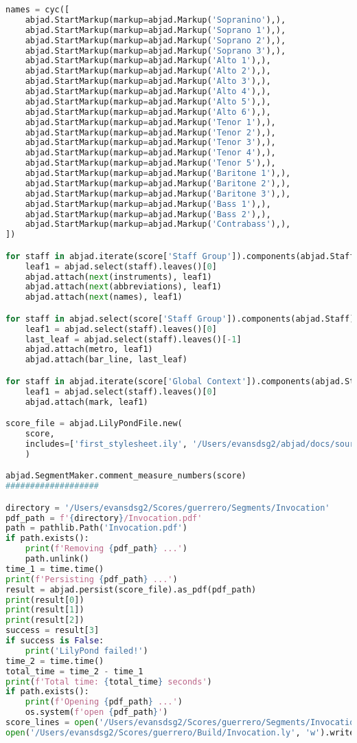 \begin{lstlisting}[language=Python, caption=Invocation Source Code]
names = cyc([
    abjad.StartMarkup(markup=abjad.Markup('Sopranino'),),
    abjad.StartMarkup(markup=abjad.Markup('Soprano 1'),),
    abjad.StartMarkup(markup=abjad.Markup('Soprano 2'),),
    abjad.StartMarkup(markup=abjad.Markup('Soprano 3'),),
    abjad.StartMarkup(markup=abjad.Markup('Alto 1'),),
    abjad.StartMarkup(markup=abjad.Markup('Alto 2'),),
    abjad.StartMarkup(markup=abjad.Markup('Alto 3'),),
    abjad.StartMarkup(markup=abjad.Markup('Alto 4'),),
    abjad.StartMarkup(markup=abjad.Markup('Alto 5'),),
    abjad.StartMarkup(markup=abjad.Markup('Alto 6'),),
    abjad.StartMarkup(markup=abjad.Markup('Tenor 1'),),
    abjad.StartMarkup(markup=abjad.Markup('Tenor 2'),),
    abjad.StartMarkup(markup=abjad.Markup('Tenor 3'),),
    abjad.StartMarkup(markup=abjad.Markup('Tenor 4'),),
    abjad.StartMarkup(markup=abjad.Markup('Tenor 5'),),
    abjad.StartMarkup(markup=abjad.Markup('Baritone 1'),),
    abjad.StartMarkup(markup=abjad.Markup('Baritone 2'),),
    abjad.StartMarkup(markup=abjad.Markup('Baritone 3'),),
    abjad.StartMarkup(markup=abjad.Markup('Bass 1'),),
    abjad.StartMarkup(markup=abjad.Markup('Bass 2'),),
    abjad.StartMarkup(markup=abjad.Markup('Contrabass'),),
])

for staff in abjad.iterate(score['Staff Group']).components(abjad.Staff):
    leaf1 = abjad.select(staff).leaves()[0]
    abjad.attach(next(instruments), leaf1)
    abjad.attach(next(abbreviations), leaf1)
    abjad.attach(next(names), leaf1)

for staff in abjad.select(score['Staff Group']).components(abjad.Staff):
    leaf1 = abjad.select(staff).leaves()[0]
    last_leaf = abjad.select(staff).leaves()[-1]
    abjad.attach(metro, leaf1)
    abjad.attach(bar_line, last_leaf)

for staff in abjad.iterate(score['Global Context']).components(abjad.Staff):
    leaf1 = abjad.select(staff).leaves()[0]
    abjad.attach(mark, leaf1)

score_file = abjad.LilyPondFile.new(
    score,
    includes=['first_stylesheet.ily', '/Users/evansdsg2/abjad/docs/source/_stylesheets/abjad.ily'],
    )

abjad.SegmentMaker.comment_measure_numbers(score)
###################

directory = '/Users/evansdsg2/Scores/guerrero/Segments/Invocation'
pdf_path = f'{directory}/Invocation.pdf'
path = pathlib.Path('Invocation.pdf')
if path.exists():
    print(f'Removing {pdf_path} ...')
    path.unlink()
time_1 = time.time()
print(f'Persisting {pdf_path} ...')
result = abjad.persist(score_file).as_pdf(pdf_path)
print(result[0])
print(result[1])
print(result[2])
success = result[3]
if success is False:
    print('LilyPond failed!')
time_2 = time.time()
total_time = time_2 - time_1
print(f'Total time: {total_time} seconds')
if path.exists():
    print(f'Opening {pdf_path} ...')
    os.system(f'open {pdf_path}')
score_lines = open('/Users/evansdsg2/Scores/guerrero/Segments/Invocation/Invocation.ly').readlines()
open('/Users/evansdsg2/Scores/guerrero/Build/Invocation.ly', 'w').writelines(score_lines[15:-1])


\end{lstlisting}
